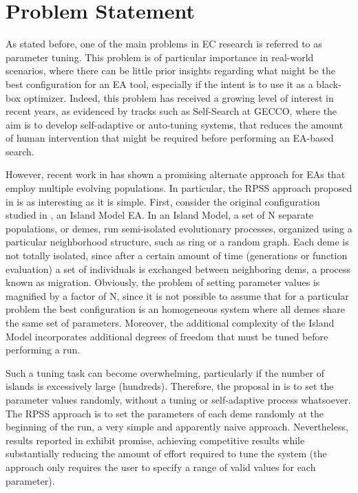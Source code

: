 \documentclass{sig-alternate}
\begin{document}
\section{Problem Statement}
As stated before, one of the main problems in EC research is referred to as parameter tuning.
This problem is of particular importance in real-world scenarios, where there can be little prior insights regarding what might be the best
configuration for an EA tool, especially if the intent is to use it as a black-box optimizer.
Indeed, this problem has received a growing level of interest in recent years, as evidenced by tracks such as Self-Search at GECCO,
where the aim is to develop self-adaptive or auto-tuning systems, that reduces the amount of human intervention that might be required before performing
an EA-based search.

However, recent work in \cite{fuku1,fuku2} has shown a promising alternate approach for EAs that employ multiple evolving populations.
In particular, the RPSS approach proposed in \cite{fuku1} is as interesting as it is simple.
First, consider the original configuration studied in \cite{fuku1,fuku2}, an Island Model EA.
In an Island Model, a set of N separate populations, or demes, run semi-isolated evolutionary processes, organized using a particular
neighborhood structure, such as ring or a random graph.
Each deme is not totally isolated, since after a certain amount of time (generations or function evaluation) a set of individuals is exchanged between
neighboring dems, a process known as migration.
Obviously, the problem of setting parameter values is magnified by a factor of N, since it is not possible to assume that for
a particular problem the best configuration is an homogeneous system where all demes share the same set of parameters.
Moreover, the additional complexity of the Island Model incorporates additional degrees of freedom that must be tuned before
performing a run.

Such a tuning task can become overwhelming, particularly if the number of islands is excessively large (hundreds).
Therefore, the proposal in \cite{fuku1} is to set the parameter values randomly, without a tuning or self-adaptive process whatsoever.
The RPSS approach is to set the parameters of each deme randomly at the beginning of the run, a very simple and apparently naive approach.
Nevertheless, results reported in \cite{fuku1,fuku2} exhibit promise, achieving competitive results while substantially reducing the amount
of effort required to tune the system (the approach only requires the user to specify a range of valid values for each parameter).
\end{document}
